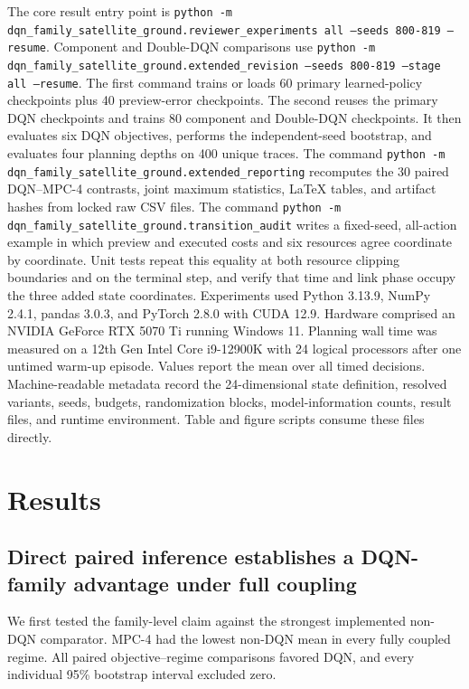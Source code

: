 \documentclass[11pt]{article}
\begin{document}
The core result entry point is \texttt{python -m dqn\_family\_satellite\_ground.\allowbreak reviewer\_experiments all \allowbreak --seeds 800-819 \allowbreak --resume}. Component and Double-DQN comparisons use \texttt{python -m dqn\_family\_satellite\_ground.\allowbreak extended\_revision \allowbreak --seeds 800-819 \allowbreak --stage all \allowbreak --resume}. The first command trains or loads 60 primary learned-policy checkpoints plus 40 preview-error checkpoints. The second reuses the primary DQN checkpoints and trains 80 component and Double-DQN checkpoints. It then evaluates six DQN objectives, performs the independent-seed bootstrap, and evaluates four planning depths on 400 unique traces. The command \texttt{python -m dqn\_family\_satellite\_ground.\allowbreak extended\_reporting} recomputes the 30 paired DQN--MPC-4 contrasts, joint maximum statistics, LaTeX tables, and artifact hashes from locked raw CSV files. The command \texttt{python -m dqn\_family\_satellite\_ground.\allowbreak transition\_audit} writes a fixed-seed, all-action example in which preview and executed costs and six resources agree coordinate by coordinate. Unit tests repeat this equality at both resource clipping boundaries and on the terminal step, and verify that time and link phase occupy the three added state coordinates. Experiments used Python 3.13.9, NumPy 2.4.1, pandas 3.0.3, and PyTorch 2.8.0 with CUDA 12.9. Hardware comprised an NVIDIA GeForce RTX 5070 Ti running Windows 11. Planning wall time was measured on a 12th Gen Intel Core i9-12900K with 24 logical processors after one untimed warm-up episode. Values report the mean over all timed decisions. Machine-readable metadata record the 24-dimensional state definition, resolved variants, seeds, budgets, randomization blocks, model-information counts, result files, and runtime environment. Table and figure scripts consume these files directly.

\section{Results}
\label{sec:results}

\subsection{Direct paired inference establishes a DQN-family advantage under full coupling}

We first tested the family-level claim against the strongest implemented non-DQN comparator. MPC-4 had the lowest non-DQN mean in every fully coupled regime. All \DQNvsMPCContrastCount{} paired objective--regime comparisons favored DQN, and every individual 95\% bootstrap interval excluded zero.
\end{document}
